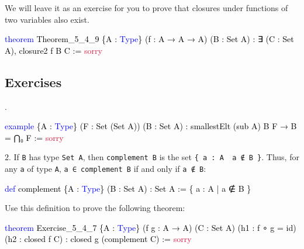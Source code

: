 \documentclass[
  letterpaper,
  DIV=11,
  numbers=noendperiod]{scrreprt}
\newenvironment{Shaded}{\begin{snugshade}}{\end{snugshade}}
\newcommand{\ConstantTok}[1]{\textcolor[rgb]{0.56,0.35,0.01}{#1}}
\newcommand{\KeywordTok}[1]{\textcolor[rgb]{0.00,0.23,0.31}{#1}}
\newcommand{\NormalTok}[1]{\textcolor[rgb]{0.00,0.23,0.31}{#1}}
\renewcommand{\NormalTok}[1]{\textcolor[HTML]{000000}{#1}}
\renewcommand{\KeywordTok}[1]{\textcolor[HTML]{0000FF}{#1}}
\renewcommand{\ConstantTok}[1]{\textcolor[HTML]{DC143C}{#1}}
\newcommand{\nobreakShaded}{\renewenvironment{Shaded}
	{\begin{tcolorbox}[frame hidden, enhanced, interior hidden, boxrule=0pt,
		borderline west={3pt}{0pt}{shadecolor}, sharp corners]}
	{\end{tcolorbox}}}
\newenvironment{numex}[1]
	{\begin{minipage}[t]{0.04\textwidth}\vspace{8pt}{#1}.
		\end{minipage}\nobreakShaded\begin{minipage}[t]{0.96\textwidth}\vspace{0pt}}
	{\end{minipage}}
\theoremstyle{remark}
\begin{document}
We will leave it as an exercise for you to prove that closures under
functions of two variables also exist.

\begin{Shaded}
\begin{Highlighting}[]
\KeywordTok{theorem}\NormalTok{ Theorem\_5\_4\_9 \{A : }\KeywordTok{Type}\NormalTok{\} (f : A → A → A) (B : Set A) :}
\NormalTok{    ∃ (C : Set A), closure2 f B C := }\ConstantTok{sorry}
\end{Highlighting}
\end{Shaded}

\hypertarget{exercises-13}{%
\subsection{Exercises}\label{exercises-13}}

\begin{numex}{1}

\begin{Shaded}
\begin{Highlighting}[]
\KeywordTok{example}\NormalTok{ \{A : }\KeywordTok{Type}\NormalTok{\} (F : Set (Set A)) (B : Set A) :}
\NormalTok{    smallestElt (sub A) B F → B = ⋂₀ F := }\ConstantTok{sorry}
\end{Highlighting}
\end{Shaded}

\end{numex}

2. If \texttt{B} has type \texttt{Set\ A}, then \texttt{complement\ B}
is the set \texttt{\{\ a\ :\ A\ \textbar{}\ a\ ∉\ B\ \}}. Thus, for any
\texttt{a} of type \texttt{A}, \texttt{a\ ∈\ complement\ B} if and only
if \texttt{a\ ∉\ B}:

\begin{Shaded}
\begin{Highlighting}[]
\KeywordTok{def}\NormalTok{ complement \{A : }\KeywordTok{Type}\NormalTok{\} (B : Set A) : Set A := \{ a : A | a ∉ B \}}
\end{Highlighting}
\end{Shaded}

Use this definition to prove the following theorem:

\begin{Shaded}
\begin{Highlighting}[]
\KeywordTok{theorem}\NormalTok{ Exercise\_5\_4\_7 \{A : }\KeywordTok{Type}\NormalTok{\} (f g : A → A) (C : Set A)}
\NormalTok{    (h1 : f ∘ g = id) (h2 : closed f C) : closed g (complement C) := }\ConstantTok{sorry}
\end{Highlighting}
\end{Shaded}
\end{document}
